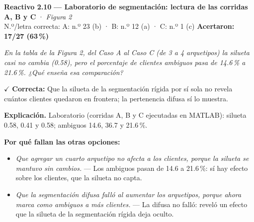 \documentclass[10pt,letterpaper]{article}
\begin{document}
\begin{minipage}{\textwidth}
{\color{guinda}\textbf{Reactivo 2.10}} \textbf{— Laboratorio de segmentación: lectura de las corridas A, B y C} · \textit{Figura 2}\\[-1pt]
{\scriptsize N.º/letra correcta: A: n.º 23 (b) · B: n.º 12 (a) · C: n.º 1 (c) \hfill \textbf{Acertaron: 17/27 (63\,\%)}}

\textit{En la tabla de la Figura 2, del Caso A al Caso C (de 3 a 4 arquetipos) la silueta casi no cambia (0.58), pero el porcentaje de clientes ambiguos pasa de 14.6\,\% a 21.6\,\%. ¿Qué enseña esa comparación?}

\textcolor{verde}{$\checkmark$} \textbf{Correcta:} Que la silueta de la segmentación rígida por sí sola no revela cuántos clientes quedaron en frontera; la pertenencia difusa sí lo muestra.

\textbf{Explicación.} Laboratorio (corridas A, B y C ejecutadas en MATLAB): silueta 0.58, 0.41 y 0.58; ambiguos 14.6, 36.7 y 21.6\,\%.

\textbf{Por qué fallan las otras opciones:}
\begin{itemize}[itemsep=0pt,topsep=1pt,leftmargin=1.3em,parsep=0pt]
\item[\textcolor{rojo}{$\times$}] \textit{Que agregar un cuarto arquetipo no afecta a los clientes, porque la silueta se mantuvo sin cambios.} --- Los ambiguos pasan de 14.6 a 21.6\,\%: sí hay efecto sobre los clientes, que la silueta no capta.
\item[\textcolor{rojo}{$\times$}] \textit{Que la segmentación difusa falló al aumentar los arquetipos, porque ahora marca como ambiguos a más clientes.} --- La difusa no falló: reveló un efecto que la silueta de la segmentación rígida deja oculto.
\end{itemize}
\end{minipage}\par\vspace{5pt}{\color{gray!40}\hrule}\vspace{5pt}
\end{document}
